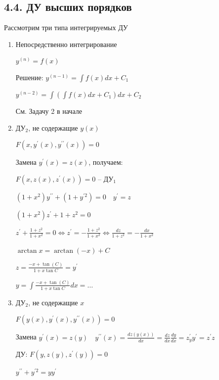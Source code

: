 \documentclass[12pt]{article}
\begin{document}
    \subsection{4.4. ДУ высших порядков}

    \hypertarget{differentilaequationshigherdegree}{}

    \Nota Рассмотрим три типа интегрируемых ДУ

    \begin{enumerate}[label*=\arabic** ]
        \item Непосредственно интегрирование

        $y^{(n)} = f(x)$

        Решение: $y^{(n - 1)} = \int f(x) dx + C_1$

        $y^{(n - 2)} = \int \left(\int f(x) dx + C_1\right) dx + C_2$

        \Ex См. Задачу 2 в начале

        \item ДУ$_2$, не содержащие $y(x)$

        $F(x, y^\prime(x), y^{\prime\prime}(x)) = 0$

        Замена $y^\prime(x) = z(x)$, получаем:

        $F(x, z(x), z^\prime(x)) = 0$ -- ДУ$_1$

        \Ex $(1 + x^2)y^{\prime\prime} + (1 + y^{\prime 2}) = 0 \quad y^\prime = z$

        $(1 + x^2)z^\prime + 1 + z^2 = 0$

        $z^\prime + \frac{1 + z^2}{1 + x^2} = 0 \Longleftrightarrow z^\prime = -\frac{1 + z^2}{1 + x^2} \Longleftrightarrow \frac{dz}{1 + z^2} = -\frac{dx}{1 + x^2}$

        $\arctan x = \arctan(-x) + C$

        $z = \frac{-x + \tan(C)}{1 + x \tan C} = y^\prime$

        $y = \int \frac{-x + \tan(C)}{1 + x \tan C} dx = \dots $

        \item ДУ$_2$, не содержащие $x$

        $F(y(x), y^\prime(x), y^{\prime\prime}(x)) = 0$

        Замена $y^\prime(x) = z(y) \quad y^{\prime\prime}(x) = \frac{dz(y(x))}{dx} = \frac{dz}{dx} \frac{dy}{dx} = z^\prime_y y^\prime = z^\prime z$

        ДУ: $F(y, z(y), z^\prime(y)) = 0$

        \Ex $y^{\prime\prime} + y^{\prime 2} = yy^\prime$


\end{enumerate}
\end{document}
